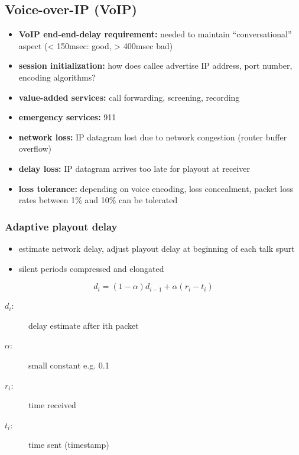 \subsection{Voice-over-IP (VoIP)}
\begin{itemize}
	\item\textbf{VoIP end-end-delay requirement:} needed to maintain ``conversational'' aspect (< 150msec: good, > 400msec bad)
	\item\textbf{session initialization:} how does callee advertise IP address, port number, encoding algorithms?
	\item\textbf{value-added services:} call forwarding, screening, recording
	\item\textbf{emergency services:} 911
	\item\textbf{network loss:} IP datagram lost due to network congestion (router buffer overflow)
	\item\textbf{delay loss:} IP datagram arrives too late for playout at receiver
	\item\textbf{loss tolerance:} depending on voice encoding, loss concealment, packet loss rates between 1\% and 10\% can be tolerated
\end{itemize}
\subsubsection{Adaptive playout delay}
\begin{itemize}
	\item estimate network delay, adjust playout delay at beginning of each talk spurt
	\item silent periods compressed and elongated
\end{itemize}
$$ d_i = (1-\alpha)d_{i-1}+\alpha(r_i-t_i) $$
\begin{description}
	\item[$d_i$:] delay estimate after ith packet
	\item[$\alpha$:] small constant e.g. 0.1
	\item[$r_i$:] time received
	\item[$t_i$:] time sent (timestamp)
\end{description}
